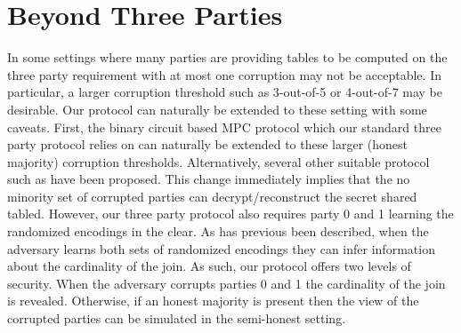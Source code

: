 \section{Beyond Three Parties}

In some settings where many parties are providing tables to be computed on the three party requirement with at most one corruption may not be acceptable. In particular, a larger corruption threshold such as 3-out-of-5 or 4-out-of-7 may be desirable. Our protocol can naturally be extended to these setting with some caveats. First, the binary circuit based MPC protocol\cite{highthroughput} which our standard three party protocol relies on can naturally be extended to these larger (honest majority) corruption thresholds. Alternatively, several other suitable protocol such as\cite{...} have been proposed. This change immediately implies that the no minority set of corrupted parties can decrypt/reconstruct the secret shared tabled. However, our three party protocol also requires party 0 and 1 learning the randomized encodings in the clear.  As has previous been described, when the adversary learns both sets of randomized encodings they can infer information about the cardinality of the join. As such, our protocol offers two levels of security. When the adversary corrupts parties 0 and 1 the cardinality of the join is revealed. Otherwise, if an honest majority is present then the view of the corrupted parties can be simulated in the semi-honest setting. 



